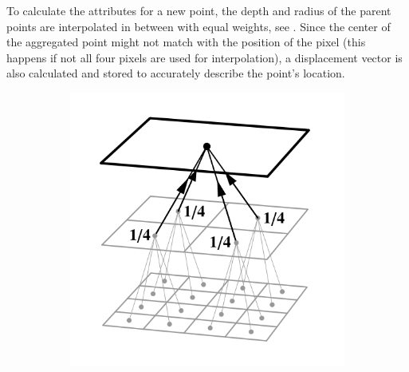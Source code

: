 To calculate the attributes for a new point, the depth and radius of the parent points are interpolated in between with equal weights, see . Since the center of the aggregated point might not match with the position of the pixel (this happens if not all four pixels are used for interpolation), a displacement vector is also calculated and stored to accurately describe the point's location.

\begin{figure}[htb]
  \centering
  \begin{subfigure}[b]{0.25\textwidth}
    \centering\includegraphics[width=\textwidth]{graphics/pull_weights_marroquim1}
    \caption{\label{fig:concept:weights_marroquim1}}
  \end{subfigure}%
  \begin{subfigure}[b]{0.25\textwidth}

\end{subfigure}
\end{figure}
